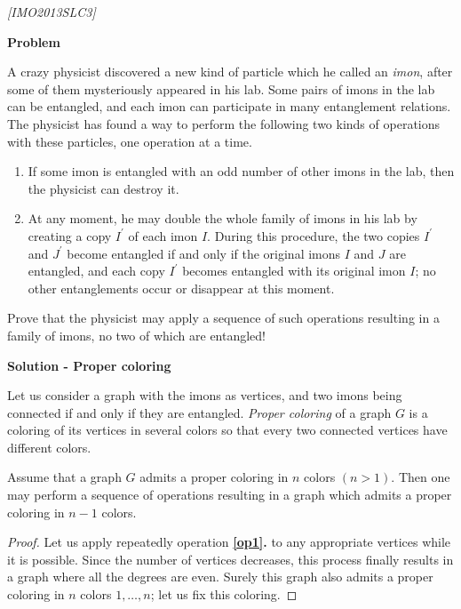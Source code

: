 \begin{problem}

\textit{[IMO2013SLC3]}


\textbf{Problem}


A crazy physicist discovered a new kind of particle which he called an \textit{imon}, after some of them mysteriously appeared in his lab. Some pairs of imons in the lab can be entangled, and each imon can participate in many entanglement relations. The physicist has found a way to perform the following two kinds of operations with these particles, one operation at a time.
\begin{enumerate}
\item \label{op1}  If some imon is entangled with an odd number of other imons in the lab, then the physicist
can destroy it.
\item \label{op2}  At any moment, he may double the whole family of imons in his lab by creating a copy $I^\prime$ of each imon $I$. During this procedure, the two copies $I^\prime$ and $J^\prime$ become entangled if and only if the original imons $I$ and $J$ are entangled, and each copy $I^\prime$ becomes entangled with its original imon $I$; no other entanglements occur or disappear at this moment.
\end{enumerate}
Prove that the physicist may apply a sequence of such operations resulting in a family of imons, no two of which are entangled!


\textbf{Solution - Proper coloring}


Let us consider a graph with the imons as vertices, and two imons being connected if and only if they are entangled. \textit{Proper coloring} of a graph $G$ is a coloring of its vertices in several colors so that every two connected vertices have different colors. 

\begin{lemma}
Assume that a graph $G$ admits a proper coloring in $n$ colors $(n > 1)$. Then one may perform a sequence of operations resulting in a graph which admits a proper coloring in $n - 1$ colors.
\end{lemma}

\begin{proof}
Let us apply repeatedly operation \textbf{\ref{op1}.} to any appropriate vertices while it is possible. Since the number of vertices decreases, this process finally results in a graph where all the degrees are even. Surely this graph also admits a proper coloring in $n$ colors $1,\dots, n$; let us fix this coloring.



\end{proof}
\end{problem}
